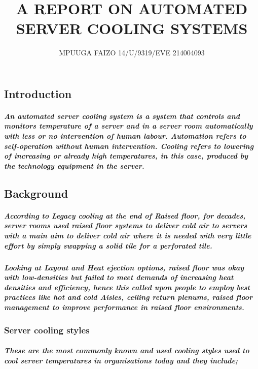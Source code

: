 \documentclass[12pt]{report}
\title{\textbf{A REPORT ON AUTOMATED SERVER COOLING SYSTEMS}}
\author{MPUUGA FAIZO 14/U/9319/EVE 214004093}
\begin{document}
\maketitle

\chapter{}
\section{Introduction} 
\paragraph{An automated server cooling system is a system that controls and monitors temperature of a server and in a server room automatically with less or no intervention of human labour.
Automation refers to self-operation without human intervention.
Cooling refers to lowering of increasing or already high temperatures, in this case, produced by the technology equipment in the server.}


 \section{Background}
\paragraph{According to Legacy cooling at the end of Raised floor, for decades, server rooms used raised floor systems to deliver cold air to servers with a main aim to deliver cold air where it is needed with very little effort by simply swapping a solid tile for a perforated tile.}

\paragraph{Looking at Layout and Heat ejection options, raised floor was okay with low-densities but failed to meet demands of increasing heat densities and efficiency, hence this called upon people to employ best practices like hot and cold Aisles, ceiling return plenums, raised floor management to improve performance in raised floor environments.}

 \subsection{Server cooling styles}
\paragraph{These are the most commonly known and used cooling styles used to cool server temperatures in organisations today and they include;}
\end{document}
